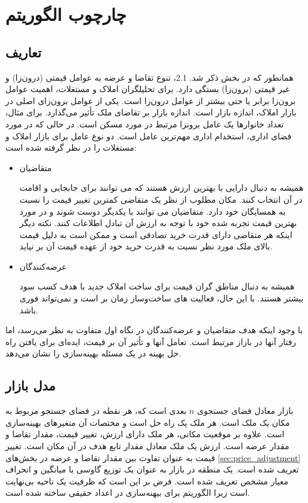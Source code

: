 \section{چارچوب الگوریتم }

\subsection{تعاریف}
همانطور که در بخش ذکر شد. 2.1، تنوع تقاضا و عرضه به عوامل قیمتی (درون‌زا) و غیر قیمتی (برون‌زا) بستگی دارد. برای تحلیلگران املاک و مستغلات، اهمیت عوامل برون‌زا  برابر یا حتی بیشتر از عوامل درون‌زا است.  یکی از عوامل برون‌زای اصلی در بازار املاک، اندازه بازار است. اندازه بازار بر تقاضای ملک تأثیر می‌گذارد. برای مثال، تعداد خانوارها یک عامل برونزا مرتبط در مورد مسکن است. در حالی که در مورد فضای اداری، استخدام اداری مهم‌ترین عامل است. دو نوع عامل برای بازار املاک و مستغلات را در نظر گرفته شده است:
\begin{itemize}
	\item متقاضیان
	
	 همیشه به دنبال دارایی با بهترین ارزش هستند که می توانند برای جابجایی و اقامت در آن انتخاب کنند. مکان مطلوب از نظر یک متقاضی کمترین تغییر قیمت را نسبت به همسایگان خود دارد. متقاضیان می توانند با یکدیگر دوست شوند و در مورد بهترین قیمت تجربه شده خود با توجه به ارزش آن تبادل اطلاعات کنند. نکته دیگر اینکه هر متقاضی دارای قدرت خرید تصادفی است و ممکن است به دلیل قیمت بالای ملک مورد نظر نسبت به قدرت خرید خود از عهده قیمت آن بر نیاید.
	\item  ‌عرضه‌کنندگان
	
	 همیشه به دنبال مناطق گران قیمت برای ساخت املاک جدید با هدف کسب سود بیشتر هستند. با این حال، فعالیت های ساخت‌و‌ساز زمان بر است و نمی‌تواند فوری باشد.
	
\end{itemize}

با وجود اینکه هدف متقاضیان و ‌عرضه‌کنندگان در نگاه اول متفاوت به نظر می‌رسد، اما رفتار آنها در بازاز مرتبط است. تعامل آنها و تأثیر آن بر قیمت، ایده‌ای برای یافتن راه حل بهینه در یک مسئله بهینه‌سازی را نشان می‌دهد.


\subsection{مدل بازار}
\label{sec:market_model}
بازار معادل فضای جستجوی $n$ بعدی است که، هر نقطه در فضای جستجو مربوط به مکان یک ملک است. هر ملک یک راه حل است و مختصات آن متغیرهای بهینه‌سازی است. علاوه بر موقعیت مکانی، هر ملک دارای ارزش، تغییر قیمت، مقدار تقاضا و مقدار عرضه است. ارزش یک ملک معادل مقدار تابع هدف در آن مکان است. تغییر قیمت به عنوان تفاوت بین مقدار تقاضا و عرضه در بخش‌های \ref{sec:price_adjustment} تعریف شده است. یک منطقه در بازار به عنوان یک توزیع گاوسی با میانگین و انحراف معیار مشخص تعریف شده است. فرض بر این است که ظرفیت یک ناحیه بی‌نهایت است زیرا الگوریتم برای بیهنه‌سازی در اعداد حقیقی ساخته شده است.


